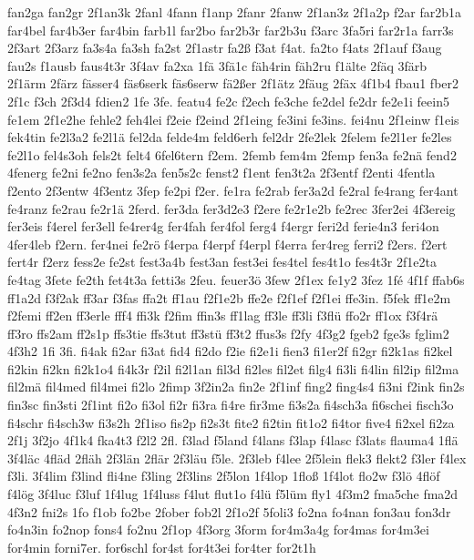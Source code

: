 {fan2ga
fan2gr
2f1an3k
2fanl
4fann
f1anp
2fanr
2fanw
2f1an3z
2f1a2p
f2ar
far2b1a
far4bel
far4b3er
far4bin
farb1l
far2bo
far2b3r
far2b3u
f3arc
3fa5ri
far2r1a
farr3s
2f3art
2f3arz
fa3s4a
fa3sh
fa2st
2f1astr
fa2ß
f3at
f4at.
fa2to
f4ats
2f1auf
f3aug
fau2s
f1ausb
faus4t3r
3f4av
fa2xa
1fä
3fä1c
fäh4rin
fäh2ru
f1älte
2fäq
3färb
2f1ärm
2färz
fässer4
fäs6serk
fäs6serw
fä2ßer
2f1ätz
2fäug
2fäx
4f1b4
fbau1
fber2
2f1c
f3ch
2f3d4
fdien2
1fe
3fe.
featu4
fe2c
f2ech
fe3che
fe2del
fe2dr
fe2e1i
feein5
fe1em
2f1e2he
fehle2
feh4lei
f2eie
f2eind
2f1eing
fe3ini
fe3ins.
fei4nu
2f1einw
f1eis
fek4tin
fe2l3a2
fe2l1ä
fel2da
felde4m
feld6erh
fel2dr
2fe2lek
2felem
fe2l1er
fe2les
fe2l1o
fel4s3oh
fels2t
felt4
6fel6tern
f2em.
2femb
fem4m
2femp
fen3a
fe2nä
fend2
4fenerg
fe2ni
fe2no
fen3s2a
fen5s2c
fenst2
f1ent
fen3t2a
2f3entf
f2enti
4fentla
f2ento
2f3entw
4f3entz
3fep
fe2pi
f2er.
fe1ra
fe2rab
fer3a2d
fe2ral
fe4rang
fer4ant
fe4ranz
fe2rau
fe2r1ä
2ferd.
fer3da
fer3d2e3
f2ere
fe2r1e2b
fe2rec
3fer2ei
4f3ereig
fer3eis
f4erel
fer3ell
fe4rer4g
fer4fah
fer4fol
ferg4
f4ergr
feri2d
ferie4n3
feri4on
4fer4leb
f2ern.
fer4nei
fe2rö
f4erpa
f4erpf
f4erpl
f4erra
fer4reg
ferri2
f2ers.
f2ert
fert4r
f2erz
fess2e
fe2st
fest3a4b
fest3an
fest3ei
fes4tel
fes4t1o
fes4t3r
2f1e2ta
fe4tag
3fete
fe2th
fet4t3a
fetti3s
2feu.
feuer3ö
3few
2f1ex
fe1y2
3fez
1fé
4f1f
ffab6s
ff1a2d
f3f2ak
ff3ar
f3fas
ffa2t
ff1au
f2f1e2b
ffe2e
f2f1ef
f2f1ei
ffe3in.
f5fek
ff1e2m
f2femi
ff2en
ff3erle
fff4
ffi3k
f2fim
ffin3s
ff1lag
ff3le
ff3li
f3flü
ffo2r
ff1ox
f3f4rä
ff3ro
ffs2am
ff2s1p
ffs3tie
ffs3tut
ff3stü
ff3t2
ffus3s
f2fy
4f3g2
fgeb2
fge3s
fglim2
4f3h2
1fi
3fi.
fi4ak
fi2ar
fi3at
fid4
fi2do
f2ie
fi2e1i
fien3
fi1er2f
fi2gr
fi2k1as
fi2kel
fi2kin
fi2kn
fi2k1o4
fi4k3r
f2il
fi2l1an
fil3d
fi2les
fil2et
filg4
fi3li
fi4lin
fil2ip
fil2ma
fil2mä
fil4med
fil4mei
fi2lo
2fimp
3f2in2a
fin2e
2f1inf
fing2
fing4s4
fi3ni
f2ink
fin2s
fin3sc
fin3sti
2f1int
fi2o
fi3ol
fi2r
fi3ra
fi4re
fir3me
fi3s2a
fi4sch3a
fi6schei
fisch3o
fi4schr
fi4sch3w
fi3s2h
2f1iso
fis2p
fi2s3t
fite2
fi2tin
fit1o2
fi4tor
five4
fi2xel
fi2za
2f1j
3f2jo
4f1k4
fka4t3
f2l2
2fl.
f3lad
f5land
f4lans
f3lap
f4lasc
f3lats
flauma4
1flä
3f4läc
4fläd
2fläh
2f3län
2flär
2f3läu
f5le.
2f3leb
f4lee
2f5lein
flek3
flekt2
f3ler
f4lex
f3li.
3f4lim
f3lind
fli4ne
f3ling
2f3lins
2f5lon
1f4lop
1floß
1f4lot
flo2w
f3lö
4flöf
f4lög
3f4luc
f3luf
1f4lug
1f4luss
f4lut
flut1o
f4lü
f5lüm
fly1
4f3m2
fma5che
fma2d
4f3n2
fni2s
1fo
f1ob
fo2be
2fober
fob2l
2f1o2f
5foli3
fo2na
fo4nan
fon3au
fon3dr
fo4n3in
fo2nop
fons4
fo2nu
2f1op
4f3org
3form
for4m3a4g
for4mas
for4m3ei
for4min
forni7er.
for6schl
for4st
for4t3ei
for4ter
for2t1h
}
